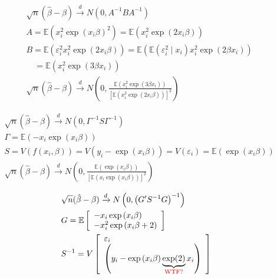 {{\begin{enumerate}[label=(\alph*)]
{\item 
$$
\begin{aligned}
& \sqrt{n}(\hat{\beta}-\beta) \xrightarrow{d} N\left(0, A^{-1} B A^{-1}\right) \\
& A=\mathbb{E}\left(x_{i}^{2} \exp \left(x_{i} \beta\right)^{2}\right)=\mathbb{E}\left(x_{i}^{2} \exp \left(2 x_{i}\beta\right)\right) \\
& B=\mathbb{E}\left(\varepsilon_{i}^{2} x_{i}^{2} \exp \left(2 x_{i} \beta\right)\right)=\mathbb{E}\left(\mathbb{E}\left(\varepsilon_{i}^{2} \mid x_{i}\right) x_{i}^{2} \exp \left(2 \beta x_{i}\right)\right) \\
& \quad=\mathbb{E}\left(x_{i}^{2} \exp \left(3 \beta x_{i}\right)\right) \\
& \sqrt{n}(\hat{\beta}-\beta) \xrightarrow{d} N\left(0, \frac{\mathbb{E}\left(x_{i}^{2} \exp \left(3 \beta x_{i}\right)\right)}{\left[\mathbb{E}\left(x_{i}^{2} \exp \left(2 x_{i}\beta\right)\right)\right]^{2}}\right)
\end{aligned}
$$
}
{\item 
$$
\begin{aligned}
& \sqrt{n}(\hat{\beta}-\beta) \xrightarrow{d} N\left(0, \Gamma^{-1} S \Gamma^{-1}\right) \\
& \Gamma=\mathbb{E}\left(-x_{i} \exp \left(x_{i} \beta\right)\right) \\
& S=V\left(f\left(x_{i}, \beta\right)\right)=V\left(y_{i}-\exp \left(x_{i} \beta\right)\right)=V\left(\varepsilon_{i}\right)=\mathbb{E}\left(\exp \left(x_{i} \beta\right)\right) \\
& \sqrt{n}(\hat{\beta}-\beta) \xrightarrow{d} N\left(0, \frac{\mathbb{E}\left(\exp \left(x_{i} \beta\right)\right)}{\left[\mathbb{E}\left(x_{i} \exp \left(x_{i} \beta\right)\right)\right]^{2}}\right)
\end{aligned}
$$
}
{\item 
$$
\begin{aligned}
& \sqrt{n}(\hat{\beta}-\beta) \xrightarrow{d} N\left(0,\left(G^{\prime} S^{-1} G\right)^{-1}\right) \\
& G=\mathbb{E}\left[\begin{array}{l}
-x_{i} \exp \left(x_{i} \beta\right) \\
-x_{i}^{2} \exp \left(x_{i} \beta+2\right)
\end{array}\right] \\
& S^{-1}=V\left[\begin{array}{l}
\varepsilon_{i} \\
\left(y_{i}-\exp \left(x_{i} \beta\right) \underbrace{\exp (2)}_{\text {\color{red}WTF?\color{black}}} x_{i}\right)
\end{array}\right]
\end{aligned}
$$
}
\end{enumerate}
}
{
}}
